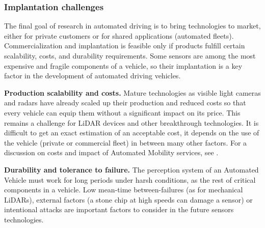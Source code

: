 
\subsubsection{Implantation challenges}

The final goal of research in automated driving is to bring technologies to
market, either for private customers or for shared applications (automated 
fleets). Commercialization and implantation is feasible only if products 
fulfill certain scalability, costs, and durability requirements.
Some sensors are among the most expensive and fragile components of a vehicle,
so their implantation is a key factor in the development of automated driving
vehicles.

\textbf{Production scalability and costs.} 
Mature technologies as visible light cameras and radars have already scaled up 
their production and reduced costs so that every vehicle can equip them without
a significant impact on its price. This remains a challenge for LiDAR devices
and other breakthrough technologies.
It is difficult to get an exact estimation of an acceptable cost, 
it depends on the use of the vehicle (private or commercial fleet)
in between many other factors. 
For a discussion on costs and impact of Automated Mobility services, see
\cite{Bosch2018}.

\textbf{Durability and tolerance to failure.}
The perception system of an Automated Vehicle must work for long
periods under harsh conditions, as the rest of critical components in a vehicle.
Low mean-time between-failures (as for mechanical LiDARs), external factors 
(a stone chip at high speeds can damage a sensor) or intentional attacks \cite{Petit2015a}
are important factors to consider in the future sensors technologies.



